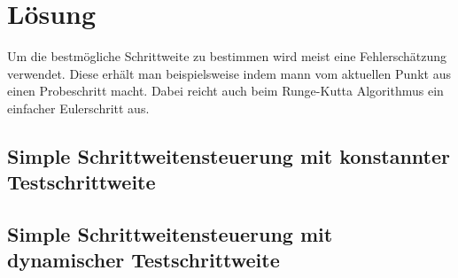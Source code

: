 %
%
%
\section{Lösung
\label{steps:section:loesung}}
Um die bestmögliche Schrittweite zu bestimmen wird meist eine Fehlerschätzung verwendet.
Diese erhält man beispielsweise indem mann vom aktuellen Punkt aus einen Probeschritt macht.
Dabei reicht auch beim Runge-Kutta Algorithmus ein einfacher Eulerschritt aus.

\subsection{Simple Schrittweitensteuerung mit konstannter Testschrittweite
\label{steps:subsection:simplestep}}

\subsection{Simple Schrittweitensteuerung mit dynamischer Testschrittweite
\label{steps:subsection:dynstep}}



